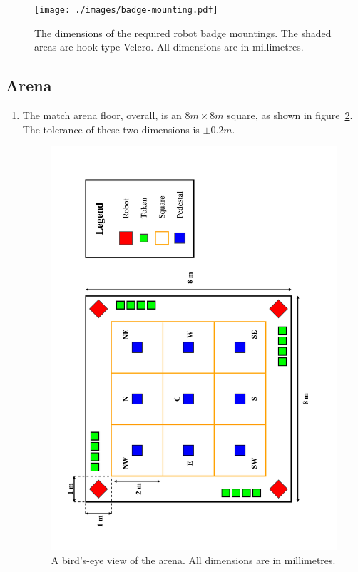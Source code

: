 \begin{enumerate}
\begin{figure}
  \centering
  \texttt{[image: ./images/badge-mounting.pdf]}
  \caption{The dimensions of the required robot badge mountings.
           The shaded areas are hook-type Velcro.
           All dimensions are in millimetres.}
  \label{fig:badge-mounting}
\end{figure}

\end{enumerate}

\subsection{Arena}
\label{sub:arena}
\begin{enumerate}
\item The match arena floor, overall, is an $8m \times 8m$ square, as shown in figure~\ref{fig:arena-dim}.
      The tolerance of these two dimensions is $\pm0.2m$.

\begin{figure}
  \centering
  \includegraphics[width=\textwidth]{./images/arena.pdf}
  \caption{\label{fig:arena-dim}A bird's-eye view of the arena. All dimensions are in millimetres.}
\end{figure}


\end{enumerate}
